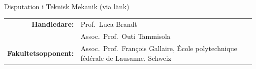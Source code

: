\begin{frame}[plain]{Disputation i Teknisk Mekanik (via länk)}
\begin{longtable}[]{@{}rl@{}}
    \begin{minipage}[t]{0.22\columnwidth}\raggedleft
      \textbf{Handledare:}\strut
    \end{minipage} & \begin{minipage}[t]{0.72\columnwidth}\raggedright
      Prof.~Luca Brandt\strut
    \end{minipage}\tabularnewline

    \begin{minipage}[t]{0.22\columnwidth}\raggedleft
      \strut
    \end{minipage} & \begin{minipage}[t]{0.72\columnwidth}\raggedright
      Assoc.~Prof.~Outi Tammisola\strut
    \end{minipage}\tabularnewline

    \begin{minipage}[t]{0.22\columnwidth}\raggedleft
      \textbf{Fakultetsopponent:}\strut
    \end{minipage} & \begin{minipage}[t]{0.72\columnwidth}\raggedright
      Assoc.~Prof.~Fran\c{c}ois Gallaire, École polytechnique fédérale de Lausanne, Schweiz\strut
    \end{minipage}\tabularnewline


\end{longtable}
\end{frame}
